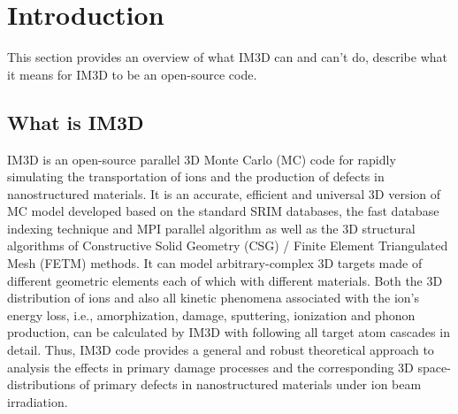 
\chapter{Introduction}  %

\label{Chapter1}  %



This section provides an overview of what IM3D can and can't do, describe what it means for IM3D to be an open-source code.


\section{What is IM3D}

IM3D is an open-source parallel 3D Monte Carlo (MC) code for rapidly simulating the transportation of ions and the production of defects in nanostructured materials. It is an accurate, efficient and universal 3D version of MC model developed based on the standard SRIM databases\cite{Ziegler:2010}, the fast database indexing technique\cite{Schiettekatte:2008} and MPI parallel algorithm as well as the 3D structural algorithms of Constructive Solid Geometry (CSG) / Finite Element Triangulated Mesh (FETM) methods\cite{Li:2005,Li:2008,Li:2009,Li2:2011,Zhang:2011,Li:2013}. It can model arbitrary-complex 3D targets made of different geometric elements each of which with different materials. Both the 3D distribution of ions and also all kinetic phenomena associated with the ion’s energy loss, i.e., amorphization, damage, sputtering, ionization and phonon production, can be calculated by IM3D with following all target atom cascades in detail. Thus, IM3D code provides a general and robust theoretical approach to analysis the effects in primary damage processes and the corresponding 3D space-distributions of primary defects in nanostructured materials under ion beam irradiation.

